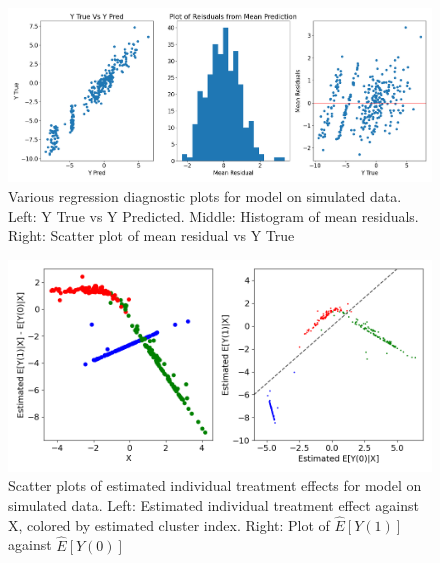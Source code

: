 \documentclass{article}
\begin{document}
\begin{figure}[H]
  \centering
  \includegraphics[width=1\textwidth]{Plots/simuated_diagnostics.png}
  \caption{Various regression diagnostic plots for model on simulated data. Left: Y True vs Y Predicted. Middle: Histogram of mean residuals. Right: Scatter plot of mean residual vs Y True}
  \label{fig:sim_diag_plots}
\end{figure}

\begin{figure}[H]
  \centering
  \includegraphics[width=1\textwidth]{Plots/Simulated_output_scatted.png}
  \caption{Scatter plots of estimated individual treatment effects for model on simulated data. Left: Estimated individual treatment effect against X, colored by estimated cluster index. Right: Plot of $\hat{E}[Y(1)]$ against $\hat{E}[Y(0)]$}
  \label{fig:sim_scatter_plots}
\end{figure}
\end{document}
